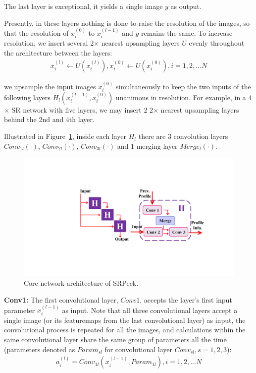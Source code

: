 The last layer is exceptional, it yields a single image $y$ as output. 

Presently, in these layers nothing is done to raise the resolution of the images, so that the resolution of $x_i^{(0)}$ to $x_i^{(l-1)}$ and $y$ remains the same. To increase resolution, we insert several 2$\times$ nearest upsampling layers $U$ evenly throughout the architecture between the layers:
\begin{equation}\label{eq:3}
    \begin{split}
        x_i^{(l)} \leftarrow U(x_i^{(l)}), x_i^{(0)} \leftarrow U(x_i^{(0)}), i=1,2,...N
\end{split}
\end{equation}

we upsample the input images $x_i^{(0)}$ simultaneously to keep the two inputs of the following layers $H_l(x_i^{(l-1)},x_i^{(0)})$ unanimous in resolution. For example, in a 4$\times$ SR network with five layers, we may insert 2 2$\times$ nearest upsampling layers behind the 2nd and 4th layer.

Illustrated in Figure~\ref{fig-system}, inside each layer $H_l$ there are 3 convolution layers $Conv_{1l}(\cdot)$, $Conv_{2l}(\cdot)$, $Conv_{3l}(\cdot)$ and 1 merging layer $Merge_l(\cdot)$.

\begin{figure}
    \centering
       \includegraphics[width=0.90\linewidth]{./pic/network.pdf}
       \caption{Core network architecture of SRPeek.}
       \label{fig-system}
   \end{figure}   

\vspace{1mm}
\noindent
\textbf{Conv1:} The first convolutional layer, $Conv1$, accepts the layer's first input parameter $x_i^{(l-1)}$ as input. Note that all three convolutional layers accept a single image (or its featuremaps from the last convolutional layer) as input, the convolutional process is repeated for all the images, and calculations within the same convolutional layer share the same group of parameters all the time (parameters denoted as $Param_{sl}$ for convolutional layer $Conv_{sl}, s=1,2,3$):
\begin{equation}\label{eq:4}
    \begin{split}
        a_i^{(l)} = Conv_{1l}(x_i^{(l-1)},Param_{1l}), i=1,2,...N
\end{split}
\end{equation}

